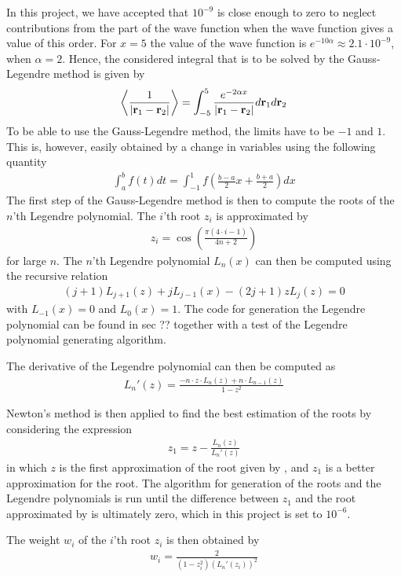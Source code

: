 In this project, we  have accepted that $10^{-9}$ is close enough to zero to neglect contributions from the part of the wave function when the wave function gives a value of this order.
For $x=5$ the value of the wave function is $e^{-10\alpha} \approx 2.1\cdot 10^{-9}$, when $\alpha = 2$.
Hence, the considered integral that is to be solved by the Gauss-Legendre method is given by
\begin{align}
   \left< \frac{1}{| \mbox{\textbf{r}}_1 - \mbox{\textbf{r}}_2 |} \right> 
   = \int _{-5} ^{5} \frac{e^{-2\alpha x}}{| \mbox{\textbf{r}}_1 - \mbox{\textbf{r}}_2 |} d \mbox{\textbf{r}}_1 d\mbox{\textbf{r}}_2
\label{eq:GLdMethod1}
\end{align} 
To be able to use the Gauss-Legendre method, the limits have to be $-1$ and $1$. 
This is, however, easily obtained by a change in variables using the following quantity
\begin{align}
	\int _a ^b f(t) dt = \int _{-1} ^1 f \left( \frac{b-a}{2} x + \frac{b+a}{2} \right) dx
	\label{eq:GLdMethod2}
\end{align} 
The first step of the Gauss-Legendre method is then to compute the roots of the $n$'th Legendre polynomial.
The $i$'th root $z_i$ is approximated by
\begin{align}
	z_i = \cos \left( \frac{\pi (4\cdot i - 1)}{4n+2} \right)
	\label{eq:GLdMethod3}
\end{align} 
for large $n$.
The $n$'th  Legendre polynomial $L_n(x)$ can then be computed using the recursive relation
\begin{align}
	(j+1)L_{j+1} (z) + j L_{j-1} (x) -(2j+1) z L_j (z) = 0
	\label{eq:GLdMethod4}
\end{align} 
with $L_{-1} (x) = 0$ and $L_0 (x) = 1$.
The code for generation the Legendre polynomial can be found in sec ??  together with a test of the Legendre polynomial generating algorithm.

The derivative of the Legendre polynomial can then be computed as
\begin{align}
	L_n '(z) = \frac{-n\cdot z \cdot L_n (z) +n \cdot L_{n-1} (z)}{1-z^2} 
	\label{eq:GLdMethod4a}
\end{align}

Newton's method is then applied to find the best estimation of the roots by considering the expression
\begin{align}
	z_1 = z- \frac{L_n(z)}{L_n'(z)}
	\label{eq:GLdMethod5}
\end{align}
in which $z$ is the first approximation of the root given by , and $z_1$ is a better approximation for the root. 
The algorithm for generation of the roots and the Legendre polynomials is run until the difference between $z_1$ and the root approximated by  is ultimately zero, which in this project is set to $10^{-6}$.

The weight $w_i$ of the $i$'th root $z_i$ is then obtained by
\begin{align}
	w_i = \frac{2}{(1-z_i^2)(L_n'(z_i))^2}
	\label{eq:GLdMethod6}
\end{align}
  

